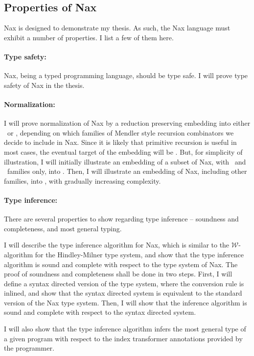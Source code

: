 \subsection{Properties of Nax}\label{sec:Nax:theory}

Nax is designed to demonstrate my thesis. As such, the Nax language must
exhibit a number of properties. I list a few of them here.

\paragraph{Type safety:}
Nax, being a typed programming language, should be type safe.
I will prove type safety of Nax in the thesis.

\paragraph{Normalization:}
I will prove normalization of Nax by a reduction preserving embedding into
either \Fi\ or \Fixw, depending on which families of Mendler style recursion
combinators we decide to include in Nax. Since it is likely that 
primitive recursion is useful in most cases, the eventual target of
the embedding will be \Fixw. But, for simplicity of illustration, I will
initially illustrate an embedding of a subset of Nax, with \MIt\ and \MsfIt\
families only, into \Fi. Then, I will illustrate an embedding of Nax,
including other families, into \Fixw, with gradually increasing complexity.

\paragraph{Type inference:}
There are several properties to show regarding type inference --
soundness and completeness, and most general typing.

I will describe the type inference algorithm for Nax, which is similar to
the $\mathcal{W}$-algorithm for the Hindley-Milner type system, and show
that the type inference algorithm is sound and complete with respect to
the type system of Nax. The proof of soundness and completeness shall be
done in two steps. First, I will define a syntax directed version of
the type system, where the conversion rule is inlined, and show that
the syntax directed system is equivalent to the standard version of
the Nax type system. Then, I will show that the inference algorithm is
sound and complete with respect to the syntax directed system.

I will also show that the type inference algorithm infers the most general type
of a given program with respect to the index transformer annotations provided by
the programmer.


